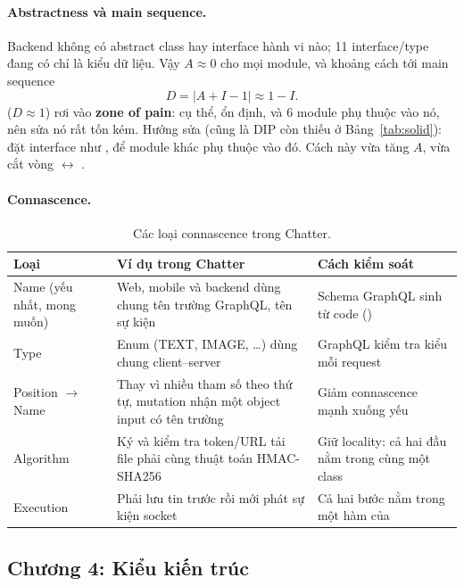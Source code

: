 \documentclass[11pt, a4paper]{article}
\begin{document}
\paragraph{Abstractness và main sequence.} Backend không có abstract class hay interface hành vi nào; 11 interface/type đang có chỉ là kiểu dữ liệu. Vậy $A \approx 0$ cho mọi module, và khoảng cách tới main sequence~\cite{martin2017clean}
\begin{equation}
  D = |A + I - 1| \approx 1 - I.
\end{equation}
 ($D \approx 1$) rơi vào \textbf{zone of pain}: cụ thể, ổn định, và 6 module phụ thuộc vào nó, nên sửa nó rất tốn kém. Hướng sửa (cũng là DIP còn thiếu ở Bảng~\ref{tab:solid}): đặt interface như ,  để module khác phụ thuộc vào đó. Cách này vừa tăng $A$, vừa cắt vòng  $\leftrightarrow$ .

\paragraph{Connascence.}
\begin{table}[H]
  \centering
  \small
  \caption{Các loại connascence trong Chatter.}
  \label{tab:connascence}
  \begin{tabularx}{\linewidth}{P{2.8cm}YY}
    \toprule
    \textbf{Loại} & \textbf{Ví dụ trong Chatter} & \textbf{Cách kiểm soát} \\
    \midrule
    Name (yếu nhất, mong muốn) & Web, mobile và backend dùng chung tên trường GraphQL, tên sự kiện  & Schema GraphQL sinh từ code () \\
    Type & Enum  (TEXT, IMAGE, \dots) dùng chung client--server & GraphQL kiểm tra kiểu mỗi request \\
    Position $\rightarrow$ Name & Thay vì nhiều tham số theo thứ tự, mutation nhận một object input có tên trường & Giảm connascence mạnh xuống yếu \\
    Algorithm & Ký và kiểm tra token/URL tải file phải cùng thuật toán HMAC-SHA256 & Giữ locality: cả hai đầu nằm trong cùng một class \\
    Execution & Phải lưu tin trước rồi mới phát sự kiện socket & Cả hai bước nằm trong một hàm của  \\
    \bottomrule
  \end{tabularx}
\end{table}

\subsection{Chương 4: Kiểu kiến trúc}
\end{document}
